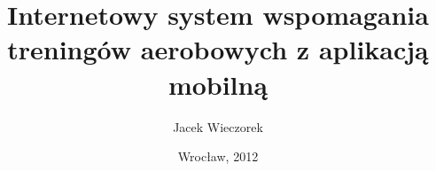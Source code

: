 \documentclass[a4paper,onecolumn,oneside,8pt]{memoir}
\makeatletter
\newcommand\uczelnia[1]{\renewcommand\@uczelnia{#1}}
\newcommand\@uczelnia{}
\newcommand\wydzial[1]{\renewcommand\@wydzial{#1}}
\newcommand\@wydzial{}
\newcommand\kierunek[1]{\renewcommand\@kierunek{#1}}
\newcommand\@kierunek{}
\newcommand\specjalnosc[1]{\renewcommand\@specjalnosc{#1}}
\newcommand\@specjalnosc{}
\newcommand\titleEN[1]{\renewcommand\@titleEN{#1}}
\newcommand\@titleEN{}
\newcommand\titleShort[1]{\renewcommand\@titleShort{#1}}
\newcommand\@titleShort{}
\newcommand\promotor[1]{\renewcommand\@promotor{#1}}
\newcommand\@promotor{}
\def\maketitle{%
  \null
  \pagestyle{empty}%
	{\centering\vspace{-1cm}
		{\fontsize{22pt}{24pt}\selectfont \@uczelnia}\\[0.4cm]
		{\fontsize{22pt}{24pt}\selectfont \@wydzial }\\[0.5cm]
		\hrule \vspace*{0.7cm}
	}
{\flushleft\fontsize{14pt}{16pt}\selectfont%
\begin{tabular}{ll}
Kierunek: & \@kierunek\\
Specjalność & \@specjalnosc\\
\end{tabular}\\[1.3cm]
}
{\centering
{\fontsize{24pt}{26pt}\selectfont Projekt Inżynierski}\\[1.5cm]
}
%
\begin{tabularx}{\linewidth}{p{6cm}>{\centering\arraybackslash}X}
		&{\fontsize{16pt}{18pt}\selectfont \@title}\\[5mm] 	%
		&{\fontsize{16pt}{18pt}\selectfont \@titleEN}\\[10mm] %
\end{tabularx}
\vfill
\begin{tabularx}{\linewidth}{p{6cm}l}
		&{\fontsize{16pt}{18pt}\selectfont Autor:}\\[5mm]
		&{\fontsize{14pt}{16pt}\selectfont \@author}\\[10mm]
		&{\fontsize{16pt}{18pt}\selectfont Prowadzący pracę:}\\[5mm]
		&{\fontsize{14pt}{16pt}\selectfont \@promotor}\\[10mm]
		&{\fontsize{16pt}{18pt}\selectfont Ocena pracy:}\\[20mm]
	\end{tabularx}
\hrule\vspace*{0.3cm}
{\centering
{\fontsize{16pt}{18pt}\selectfont \@date}\\[0cm]
}
\normalfont
 \cleardoublepage
}
\makeatother
\begin{document}
\title{Internetowy system wspomagania treningów aerobowych z aplikacją mobilną}
\titleShort{Internetowy system wspomagania ...}
\titleEN{Internet system for aerobic training with a mobile application}
\author{Jacek Wieczorek}
\uczelnia{Politechnika Wrocławska}
\wydzial{Wydział Elektroniki}
\kierunek{Informatyka}
\specjalnosc{Inżynieria Internetowa}
\promotor{dr inż. Tomasz Walkowiak}
\date{Wrocław, 2012}

\pagestyle{outer}

\tableofcontents







% 







\nocite{*}
\end{document}
